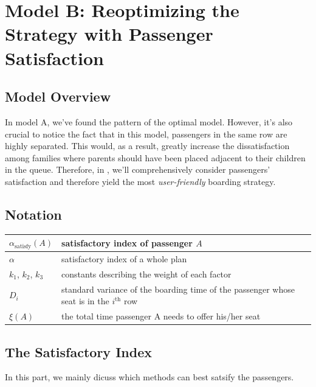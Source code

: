 \documentclass{article}
\theoremstyle{definition}
\theoremstyle{remark}
\numberwithin{equation}{section}
\begin{document}
	\section{Model B: Reoptimizing the Strategy with Passenger Satisfaction}
	\subsection{Model Overview}
	In model A, we've found the pattern of the optimal model. However, it's also crucial to notice the fact that in this model, passengers in the same row are highly separated. This would, as a result, greatly increase the dissatisfaction among families where parents should have been placed adjacent to their children in the queue. Therefore, in , we'll comprehensively consider passengers' satisfaction and therefore yield the most \textit{user-friendly} boarding strategy.
	\subsection{Notation}
	\begin{center}
	\begin{tabular}{|l|l|}
		\hline
		$\alpha_\text{satisfy}(A)$&satisfactory index of passenger $A$\\
		\hline
		$\alpha$&satisfactory index of a whole plan\\
		\hline
		$k_1$, $k_2$, $k_3$&constants describing the weight of each factor\\
		\hline
		$D_i$&standard variance of the boarding time of the passenger whose seat is in the $i^\text{th}$ row\\
		\hline
		\(\xi\left(A\right)\) & the total time passenger A needs to offer his/her seat\\
		\hline
	\end{tabular}
	\end{center}
	\subsection{The Satisfactory Index}
	In this part, we mainly dicuss which methods can best satsify the passengers.
\end{document}
